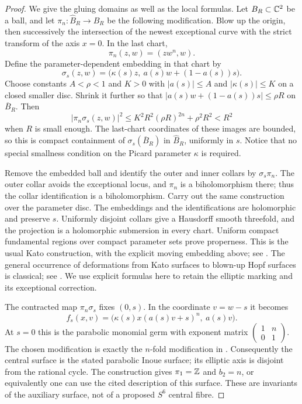 \begin{proof}
We give the gluing domains as well as the local formulas. Let
$B_R\subset\mathbb C^2$ be a ball, and let
$\pi_n:\widehat B_R\to B_R$ be the following modification.
Blow up the origin, then successively the intersection of the newest
exceptional curve with the strict transform of the axis $x=0$.
In the last chart,
\[
 \pi_n(z,w)=(zw^n,w).
\]
Define the parameter-dependent embedding in that chart by
\[
 \sigma_s(z,w)=
       \bigl(\kappa(s)z,\ a(s)w+(1-a(s))s\bigr).
\]
Choose constants $A<\rho<1$ and $K>0$ with
$|a(s)|\le A$ and $|\kappa(s)|\le K$ on a closed smaller disc.
Shrink it further so that
$|a(s)w+(1-a(s))s|\le\rho R$ on $\overline B_R$.
Then
\[
 |\pi_n\sigma_s(z,w)|^2
 \le K^2R^2(\rho R)^{2n}+\rho^2R^2<R^2
\]
when $R$ is small enough. The last-chart coordinates of these images
are bounded, so this is compact containment of
$\sigma_s(\overline B_R)$ in $\widehat B_R$, uniformly in $s$.
Notice that no special smallness condition on the Picard parameter
$\kappa$ is required.

Remove the embedded ball and identify the outer and inner collars by
$\sigma_s\pi_n$. The outer collar avoids the exceptional locus, and
$\pi_n$ is a biholomorphism there; thus the collar identification is
a biholomorphism. Carry out the same construction over the parameter
disc. The embeddings and the identifications are holomorphic and
preserve $s$. Uniformly disjoint collars give a Hausdorff smooth
threefold, and the projection is a holomorphic submersion in every
chart. Uniform compact fundamental regions over compact parameter
sets prove properness. This is the usual Kato construction, with
the explicit moving embedding above; see
\citet[Section 2, pp.1351--1353]{IstratiEtAl2022Root}.
The general occurrence of deformations from Kato surfaces to
blown-up Hopf surfaces is classical; see
\citet[Introduction, pp.1750--1751]{Teleman2010AB}.
We use explicit formulas here to retain the elliptic marking and
its exceptional correction.

The contracted map $\pi_n\sigma_s$ fixes $(0,s)$.
In the coordinate $v=w-s$ it becomes
\[
 f_s(x,v)=
    \bigl(\kappa(s)x(a(s)v+s)^n,\ a(s)v\bigr).
\]
At $s=0$ this is the parabolic monomial germ with exponent matrix
$\left(\begin{smallmatrix}1&n\\0&1\end{smallmatrix}\right)$.
The chosen modification is exactly the $n$-fold modification in
\citet[Example 9.10, p.1386]{IstratiEtAl2022Root}.
Consequently the central surface is the stated parabolic Inoue
surface; its elliptic axis is disjoint from the rational cycle.
The construction gives $\pi_1=\mathbb Z$ and $b_2=n$, or equivalently one
can use the cited description of this surface. These are invariants
of the auxiliary surface, not of a proposed $S^6$ central fibre.


\end{proof}
